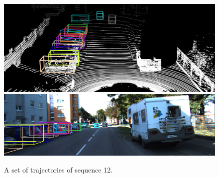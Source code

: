 \documentclass{bmvc2k}
\begin{document}
\begin{figure}
{\begin{minipage}[b]{0.5\linewidth}
	\includegraphics[width=0.95\linewidth]{images/supplementary/12/pc/01.png}\vspace{1pt}
	\includegraphics[width=0.95\linewidth]{images/supplementary/12/img/01.png}
	\end{minipage}}
	\caption{A set of trajectories of sequence 12.}
\end{figure}
\end{document}
